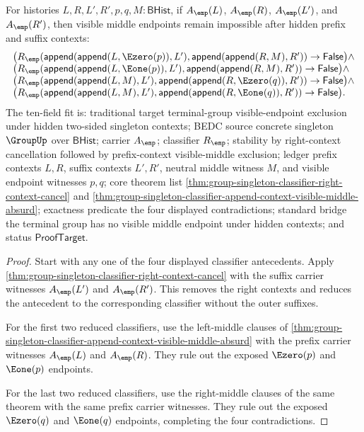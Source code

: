 \begin{theorem}
\label{thm:group-singleton-two-sided-contextual-visible-middle-absurd}
For histories $L,R,L',R',p,q,M:\mathsf{BHist}$, if $A_{\emp}(L)$,
$A_{\emp}(R)$, $A_{\emp}(L')$, and $A_{\emp}(R')$, then visible middle
endpoints remain impossible after hidden prefix and suffix contexts:
$$
\begin{array}{l}
\bigl(R_{\emp}(\mathsf{append}(\mathsf{append}(L,\Ezero(p)),L'),
\mathsf{append}(\mathsf{append}(R,M),R'))\to \mathsf{False}\bigr)\land\\
\bigl(R_{\emp}(\mathsf{append}(\mathsf{append}(L,\Eone(p)),L'),
\mathsf{append}(\mathsf{append}(R,M),R'))\to \mathsf{False}\bigr)\land\\
\bigl(R_{\emp}(\mathsf{append}(\mathsf{append}(L,M),L'),
\mathsf{append}(\mathsf{append}(R,\Ezero(q)),R'))\to \mathsf{False}\bigr)\land\\
\bigl(R_{\emp}(\mathsf{append}(\mathsf{append}(L,M),L'),
\mathsf{append}(\mathsf{append}(R,\Eone(q)),R'))\to \mathsf{False}\bigr).
\end{array}
$$
The ten-field fit is: traditional target terminal-group visible-endpoint
exclusion under hidden two-sided singleton contexts; BEDC source concrete
singleton $\GroupUp$ over $\mathsf{BHist}$; carrier $A_{\emp}$; classifier
$R_{\emp}$; stability by right-context cancellation followed by prefix-context
visible-middle exclusion; ledger prefix contexts $L,R$, suffix contexts
$L',R'$, neutral middle witness $M$, and visible endpoint witnesses $p,q$; core
theorem list \autoref{thm:group-singleton-classifier-right-context-cancel} and
\autoref{thm:group-singleton-classifier-append-context-visible-middle-absurd};
exactness predicate the four displayed contradictions; standard bridge the
terminal group has no visible middle endpoint under hidden contexts; and status
$\mathsf{ProofTarget}$.
\end{theorem}
\begin{proof}
Start with any one of the four displayed classifier antecedents. Apply
\autoref{thm:group-singleton-classifier-right-context-cancel} with the suffix
carrier witnesses $A_{\emp}(L')$ and $A_{\emp}(R')$. This removes the right
contexts and reduces the antecedent to the corresponding classifier without the
outer suffixes.

For the first two reduced classifiers, use the left-middle clauses of
\autoref{thm:group-singleton-classifier-append-context-visible-middle-absurd}
with the prefix carrier witnesses $A_{\emp}(L)$ and $A_{\emp}(R)$. They rule
out the exposed $\Ezero(p)$ and $\Eone(p)$ endpoints.

For the last two reduced classifiers, use the right-middle clauses of the same
theorem with the same prefix carrier witnesses. They rule out the exposed
$\Ezero(q)$ and $\Eone(q)$ endpoints, completing the four contradictions.
\end{proof}

